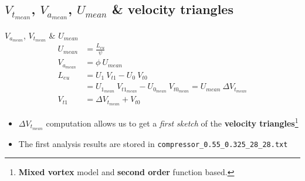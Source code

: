 \subsection{$V_{t_{mean}}$, $V_{a_{mean}}$, $U_{mean}$ \& velocity triangles}
\begin{frame}[fragile]{$V_{a_{mean}}$, $V_{t_{mean}}$ \& $U_{mean}$}
	\begin{align}
		U_{mean} & = \frac{L_{eu}}{\psi} \nonumber \\ 
		V_{a_{mean}} & = \phi \ U_{mean} \nonumber \\
		L_{eu} & = U_1 \ V_{t1} - U_0 \ V_{t0} \nonumber \\ 
		       & = U_{1_{mean}} \ V_{t1_{mean}} - U_{0_{mean}} \ V_{t0_{mean}} = U_{mean} \ \Delta V_{t_{mean}} \nonumber \\
		V_{t1} & = \Delta V_{t_{mean}} + V_{t0} \nonumber  
	\end{align}
	\begin{itemize}
		\item $\Delta V_{t_{mean}}$ computation allows us to get a \textit{first sketch} of the \textbf{velocity triangles}\footnote{\textbf{Mixed vortex} model and \textbf{second order} function based.}
		\item The first analysis results are stored in \verb|compressor_0.55_0.325_28_28.txt|
	\end{itemize}
\end{frame}
